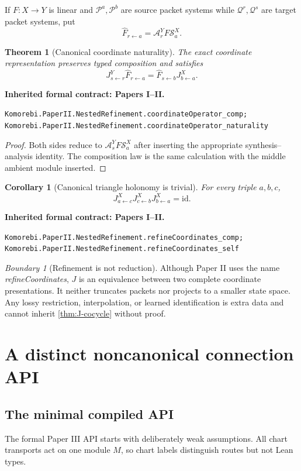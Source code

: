 \documentclass[11pt,a4paper]{article}
\newtheorem{theorem}{Theorem}[section]
\theoremstyle{plain}
\newtheorem{corollary}[corollary]{Corollary}
\theoremstyle{definition}
\theoremstyle{remark}
\newtheorem{boundary}[boundary]{Boundary}
\newcommand{\cA}{\mathcal A}
\newcommand{\cP}{\mathcal P}
\newcommand{\cQ}{\mathcal Q}
\newcommand{\cS}{\mathcal S}
\newcommand{\id}{\mathrm{id}}
\newcommand{\leanname}[1]{\nolinkurl{#1}}
\newcommand{\statusleanprior}[1]{\par\smallskip\noindent\begin{minipage}{\linewidth}{\color{leanblue}\textbf{Inherited formal contract: Papers I--II.}}\par\begingroup\small\raggedright\leanname{#1}\par\endgroup\end{minipage}\par\smallskip}
\begin{document}
If $F:X\to Y$ is linear and $\cP^a,\cP^b$ are source packet systems while
$\cQ^r,\cQ^s$ are target packet systems, put
\[
\widehat F_{r\leftarrow a}
=
\cA^Y_rF\cS^X_a.
\]

\begin{theorem}[Canonical coordinate naturality]
\label{thm:canonical-naturality}
The exact coordinate representation preserves typed composition and satisfies
\[
J^Y_{s\leftarrow r}\widehat F_{r\leftarrow a}
=
\widehat F_{s\leftarrow b}J^X_{b\leftarrow a}.
\]
\end{theorem}
\statusleanprior{Komorebi.PaperII.NestedRefinement.coordinateOperator_comp; Komorebi.PaperII.NestedRefinement.coordinateOperator_naturality}

\begin{proof}
Both sides reduce to $\cA^Y_sF\cS^X_a$ after inserting the appropriate
synthesis--analysis identity.  The composition law is the same calculation
with the middle ambient module inserted.
\end{proof}

\begin{corollary}[Canonical triangle holonomy is trivial]
\label{cor:J-flat}
For every triple $a,b,c$,
\[
J^X_{a\leftarrow c}J^X_{c\leftarrow b}J^X_{b\leftarrow a}=\id.
\]
\end{corollary}
\statusleanprior{Komorebi.PaperII.NestedRefinement.refineCoordinates_comp; Komorebi.PaperII.NestedRefinement.refineCoordinates_self}

\begin{boundary}[Refinement is not reduction]
Although Paper II uses the name \emph{refineCoordinates}, $J$ is an
equivalence between two complete coordinate presentations.  It neither
truncates packets nor projects to a smaller state space.  Any lossy
restriction, interpolation, or learned identification is extra data and
cannot inherit \cref{thm:J-cocycle} without proof.
\end{boundary}

\section{A distinct noncanonical connection API}
\label{sec:connection}

\subsection{The minimal compiled API}

The formal Paper III API starts with deliberately weak assumptions.  All
chart transports act on one module $M$, so chart labels distinguish routes
but not Lean types.
\end{document}
